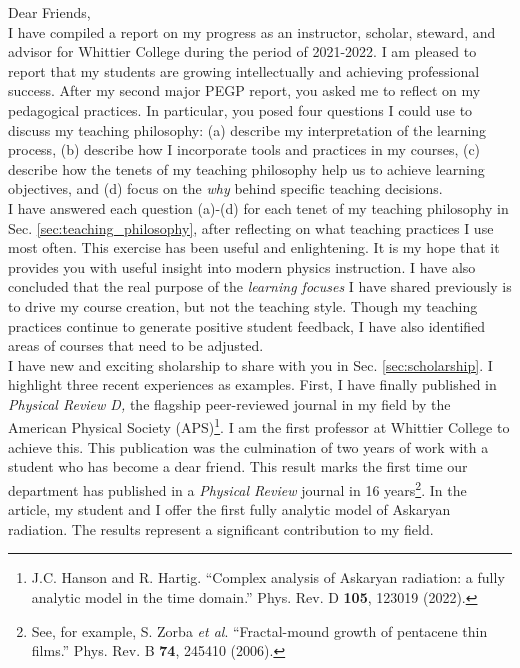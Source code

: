 \documentclass[../../main.tex]{subfiles}
\begin{document}
Dear Friends,
\\
\vspace{0.15cm}
I have compiled a report on my progress as an instructor, scholar, steward, and advisor for Whittier College during the period of 2021-2022.  I am pleased to report that my students are growing intellectually and achieving professional success.  After my second major PEGP report, you asked me to reflect on my pedagogical practices.  In particular, you posed four questions I could use to discuss my teaching philosophy: (a) describe my interpretation of the learning process, (b) describe how I incorporate tools and practices in my courses, (c) describe how the tenets of my teaching philosophy help us to achieve learning objectives, and (d) focus on the \textit{why} behind specific teaching decisions.
\\
\vspace{0.15cm}
I have answered each question (a)-(d) for each tenet of my teaching philosophy in Sec. \ref{sec:teaching_philosophy}, after reflecting on what teaching practices I use most often.  This exercise has been useful and enlightening.  It is my hope that it provides you with useful insight into modern physics instruction.  I have also concluded that the real purpose of the \textit{learning focuses} I have shared previously is to drive my course creation, but not the teaching style.  Though my teaching practices continue to generate positive student feedback, I have also identified areas of courses that need to be adjusted.
\\
\vspace{0.15cm}
I have new and exciting sholarship to share with you in Sec. \ref{sec:scholarship}.  I highlight three recent experiences as examples.  First, I have finally published in \textit{Physical Review D,} the flagship peer-reviewed journal in my field by the American Physical Society (APS)\footnote{J.C. Hanson and R. Hartig. ``Complex analysis of Askaryan radiation: a fully analytic model in the time domain.'' Phys. Rev. D \textbf{105}, 123019 (2022).}.  I am the first professor at Whittier College to achieve this.  This publication was the culmination of two years of work with a student who has become a dear friend.  This result marks the first time our department has published in a \textit{Physical Review} journal in 16 years\footnote{See, for example, S. Zorba \textit{et al}. ``Fractal-mound growth of pentacene thin films.'' Phys. Rev. B \textbf{74}, 245410 (2006).}.  In the article, my student and I offer the first fully analytic model of Askaryan radiation.  The results represent a significant contribution to my field.
\end{document}

